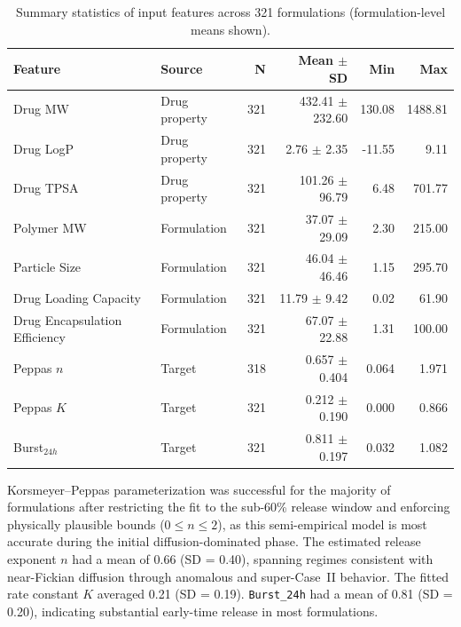 \documentclass[preprint,12pt,authoryear]{elsarticle}
\begin{document}

\begin{table}[H]
\centering
\caption{Summary statistics of input features across 321 formulations (formulation-level means shown).}
\label{tab:summary_stats}
\small
\begin{tabular}{llrrrr}
\toprule
Feature & Source & N & Mean $\pm$ SD & Min & Max \\
\midrule
Drug MW & Drug property & 321 & 432.41 $\pm$ 232.60 & 130.08 & 1488.81 \\
Drug LogP & Drug property & 321 & 2.76 $\pm$ 2.35 & -11.55 & 9.11 \\
Drug TPSA & Drug property & 321 & 101.26 $\pm$ 96.79 & 6.48 & 701.77 \\
Polymer MW & Formulation & 321 & 37.07 $\pm$ 29.09 & 2.30 & 215.00 \\
Particle Size & Formulation & 321 & 46.04 $\pm$ 46.46 & 1.15 & 295.70 \\
Drug Loading Capacity & Formulation & 321 & 11.79 $\pm$ 9.42 & 0.02 & 61.90 \\
Drug Encapsulation Efficiency & Formulation & 321 & 67.07 $\pm$ 22.88 & 1.31 & 100.00 \\
\midrule
Peppas $n$ & Target & 318 & 0.657 $\pm$ 0.404 & 0.064 & 1.971 \\
Peppas $K$ & Target & 321 & 0.212 $\pm$ 0.190 & 0.000 & 0.866 \\
Burst$_{24h}$ & Target & 321 & 0.811 $\pm$ 0.197 & 0.032 & 1.082 \\
\bottomrule
\end{tabular}
\end{table}

Korsmeyer--Peppas parameterization was successful for the majority of formulations after restricting the fit to the sub-60\% release window and enforcing physically plausible bounds ($0 \le n \le 2$), as this semi-empirical model is most accurate during the initial diffusion-dominated phase. The estimated release exponent $n$ had a mean of 0.66 (SD = 0.40), spanning regimes consistent with near-Fickian diffusion through anomalous and super-Case~II behavior. The fitted rate constant $K$ averaged 0.21 (SD = 0.19). \texttt{Burst\_24h} had a mean of 0.81 (SD = 0.20), indicating substantial early-time release in most formulations.

\FloatBarrier

\end{document}
